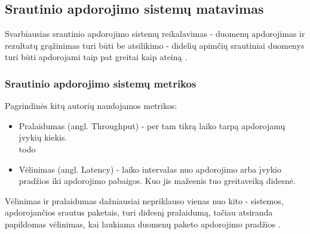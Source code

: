 \documentclass{VUMIFPSbakalaurinis}
\begin{document}
\subsection{Srautinio apdorojimo sistemų matavimas}
Svarbiausias srautinio apdorojimo sistemų reikalavimas - duomenų apdorojimas ir rezultatų grąžinimas turi būti be atsilikimo - didelių apimčių srautiniai duomenys turi būti apdorojami taip pat greitai kaip ateiną \cite{stonebraker20058}. 

\subsubsection{Srautinio apdorojimo sistemų metrikos}
Pagrindinės kitų autorių naudojamos metrikos:
\begin{itemize}
    \item Pralaidumas (angl. Throughput) - per tam tikrą laiko tarpą apdorojamų įvykių kiekis. \\todo
    \item Vėlinimas (angl. Latency) - laiko intervalas nuo apdorojimo arba įvykio pradžios iki apdorojimo pabaigos. Kuo jis mažesnis tuo greitaveiką didesnė.
\end{itemize}
Vėlinimas ir pralaidumas dažniausiai nepriklauso vienas nuo kito - sistemos, apdorojančios srautus paketais, turi didesnį pralaidumą, tačiau atsiranda papildomas vėlinimas, kai laukiama duomenų paketo apdorojimo pradžios \cite{Karimov2018BenchmarkingDS}. \par
\end{document}
